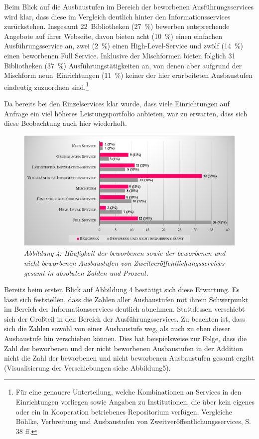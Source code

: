 \documentclass[a4paper,
fontsize=11pt,
oneside,
numbers=noperiodatend,
parskip=half-,
bibliography=totoc,
final
]{scrartcl}
\begin{document}
Beim Blick auf die Ausbaustufen im Bereich der beworbenen
Ausführungsservices wird klar, dass diese im Vergleich deutlich hinter
den Informationsservices zurückstehen. Insgesamt 22~Bibliotheken (27~\%)
bewerben entsprechende Angebote auf ihrer Webseite, davon bieten acht
(10~\%) einen einfachen Ausführungsservice an, zwei (2~\%) einen
High-Level-Service und zwölf (14~\%) einen beworbenen Full Service.
Inklusive der Mischformen bieten folglich 31 Bibliotheken (37~\%)
Ausführungstätigkeiten an, von denen aber aufgrund der Mischform
neun~Einrichtungen (11~\%) keiner der hier erarbeiteten Ausbaustufen
eindeutig zuzuordnen sind.\footnote{Für eine genauere Unterteilung,
  welche Kombinationen an Services in den Einrichtungen vorliegen sowie
  Angaben zu Institutionen, die über kein eigenes oder ein in
  Kooperation betriebenes Repositorium verfügen, Vergleiche Böhlke,
  Verbreitung und Ausbaustufen von Zweitveröffentlichungsservices, S. 38
  ff.}

Da bereits bei den Einzelservices klar wurde, dass viele Einrichtungen
auf Anfrage ein viel höheres Leistungsportfolio anbieten, war zu
erwarten, dass sich diese Beobachtung auch hier wiederholt.

\begin{figure}[h!]
\centering
\includegraphics[width=.9\textwidth]{img/abb4.png}
\caption{\textit{Abbildung 4: Häufigkeit der beworbenen sowie der beworbenen und
nicht beworbenen Ausbaustufen von Zweitveröffentlichungsservices gesamt
in absoluten Zahlen und Prozent.}}
\end{figure}

Bereits beim ersten Blick auf Abbildung 4 bestätigt sich diese
Erwartung. Es lässt sich feststellen, dass die Zahlen aller Ausbaustufen
mit ihrem Schwerpunkt im Bereich der Informationsservices deutlich
abnehmen. Stattdessen verschiebt sich der Großteil in den Bereich der
Ausführungsservices. Zu beachten ist, dass sich die Zahlen sowohl von
einer Ausbaustufe weg, als auch zu eben dieser Ausbaustufe hin
verschieben können. Dies hat beispielsweise zur Folge, dass die Zahl der
beworbenen und der nicht beworbenen Ausbaustufen in der Addition nicht
die Zahl der beworbenen und nicht beworbenen Ausbaustufen gesamt ergibt
(Visualisierung der Verschiebungen siehe Abbildung5).
\end{document}
